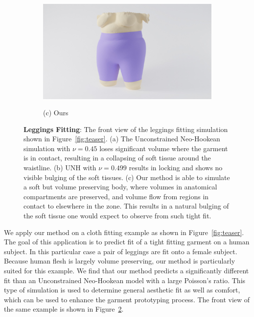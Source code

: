 \begin{figure}[ht]
\begin{subfigure}{.32\linewidth}
		{\includegraphics[width=6.5in]{images/body_xl/vc-zones_epi120-6.jpg}}
		\caption*{(c) Ours}
		\label{sfig:teaser_ours}
	\end{subfigure}
	\caption{\textbf{Leggings Fitting}: The front view of the leggings fitting simulation shown in
		Figure~\ref{fig:teaser}. (a) The Unconstrained Neo-Hookean simulation with $\nu = 0.45$ loses significant
		volume where the garment is in contact, resulting in a collapsing of soft tissue around the waistline.
		(b) UNH with $\nu = 0.499$ results in locking and shows no visible bulging of the soft tissues.
		(c) Our method is able to simulate a soft but volume preserving body, where
		volumes in anatomical compartments are preserved, and volume flow from regions in contact to
		elsewhere in the zone. This results in a natural bulging of the soft tissue one would expect to observe
		from such tight fit. }
	\label{fig:body_xl}
\end{figure}

We apply our method on a cloth fitting example as shown in Figure~\ref{fig:teaser}. The goal of this
application is to predict fit of a tight fitting garment on a human subject. In this particular case
a pair of leggings are fit onto a female subject. Because human flesh is largely volume preserving, our
method is particularly suited for this example. We find that our method predicts a significantly
different fit than an Unconstrained Neo-Hookean model with a large Poisson's ratio.  This type of
simulation is used to determine general aesthetic fit as well as comfort, which can be used to
enhance the garment prototyping process. The front view of the same example is shown in
Figure~\ref{fig:body_xl}.